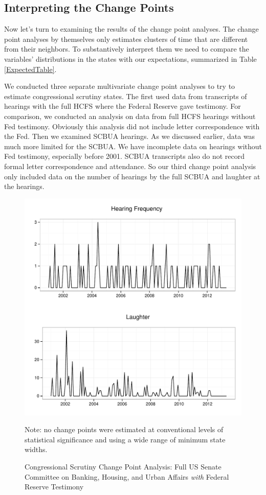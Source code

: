 \documentclass[a4paper]{article}\usepackage[]{graphicx}\usepackage[]{color}
\newenvironment{knitrout}{}{} %
\begin{document}
\subsection{Interpreting the Change Points}

Now let's turn to examining the results of the change point analyses. The change point analyses by themselves only estimates clusters of time that are different from their neighbors. To substantively interpret them we need to compare the variables' distributions in the states with our expectations, summarized in Table \ref{ExpectedTable}.

We conducted three separate multivariate change point analyses to try to estimate congressional scrutiny states. The first used data from transcripts of hearings with the full HCFS where the Federal Reserve gave testimony. For comparison, we conducted an analysis on data from full HCFS hearings without Fed testimony. Obviously this analysis did not include letter correspondence with the Fed. Then we examined SCBUA hearings. As we discussed earlier, data was much more limited for the SCBUA. We have incomplete data on hearings without Fed testimony, especially before 2001. SCBUA transcripts also do not record formal letter correspondence and attendance. So our third change point analysis only included data on the number of hearings by the full SCBUA and laughter at the hearings.

\begin{figure}
    \caption{Congressional Scrutiny Change Point Analysis: Full US Senate Committee on Banking, Housing, and Urban Affairs \emph{with} Federal Reserve Testimony}
    \label{fig:SenateFedCP}
\begin{knitrout}
\color{fgcolor}

{\centering \includegraphics[width=0.8\linewidth]{figure/ScrutinySenate} 

}



\end{knitrout}
{\scriptsize{Note: no change points were estimated at conventional levels of statistical significance and using a wide range of minimum state widths.}}
\end{figure}
\end{document}
